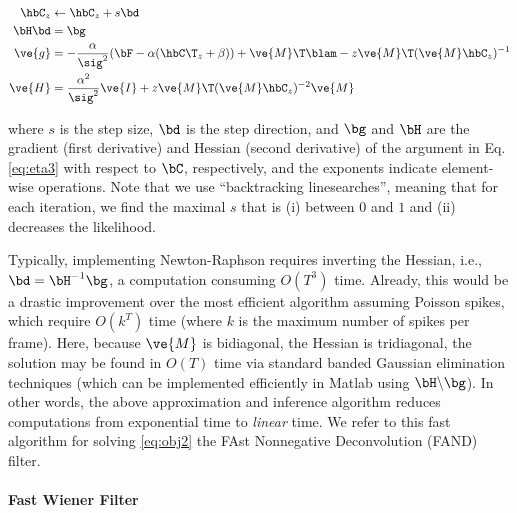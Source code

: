 
\begin{subequations} \label{eq:NR}
\begin{align}
\hbC_{\zzz} &\leftarrow \hbC_{\zzz} + s \bd \\
\bH \bd &= \bg \\
\ve{g} &= -\frac{\alpha}{\sig^2}(\bF -\alpha({\hbC\T}_{\zzz} + \beta)) + \ve{M}\T\blam - \zzz \ve{M}\T (\ve{M} \hbC_{\zzz})^{-1} \label{eq:g} \\
\ve{H} &= \frac{\alpha^2}{\sig^2} \ve{I} + \zzz \ve{M}\T (\ve{M} \hbC_{\zzz})^{-2} \ve{M} \label{eq:H}
\end{align}
\end{subequations}

\noindent where $s$ is the step size, $\bd$ is the step direction, and $\bg$ and $\bH$ are the gradient (first derivative) and Hessian (second derivative) of the argument in Eq. \eqref{eq:eta3} with respect to $\bC$, respectively, and the exponents indicate element-wise operations. Note that we use ``backtracking linesearches'', meaning that for each iteration, we find the maximal $s$ that is (i) between $0$ and $1$ and (ii) decreases the likelihood.

Typically, implementing Newton-Raphson requires inverting the Hessian, i.e., $\bd = \bH^{-1} \bg$, a computation consuming $O(T^3)$ time. Already, this would be a drastic improvement over the most efficient algorithm assuming Poisson spikes, which require $O(k^T)$ time (where $k$ is the maximum number of spikes per frame).  Here, because $\ve{M}$ is bidiagonal, the Hessian is tridiagonal, the solution may be found in $O(T)$ time via standard banded Gaussian elimination techniques (which can be implemented efficiently in Matlab using $\bH \backslash \bg$). In other words, the above approximation and inference algorithm reduces computations from exponential time to \emph{linear} time. We refer to this fast algorithm for solving \eqref{eq:obj2} the FAst Nonnegative Deconvolution (FAND) filter. 


\paragraph{Fast Wiener Filter}

